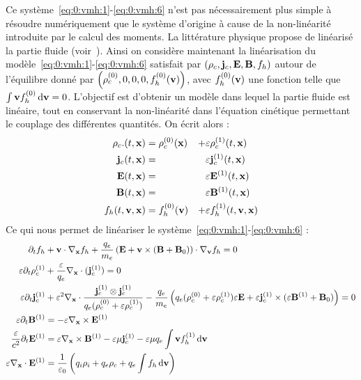 Ce système~\eqref{eq:0:vmh:1}-\eqref{eq:0:vmh:6} n'est pas nécessairement plus simple à résoudre numériquement que le système d'origine à cause de la non-linéarité introduite par le calcul des moments. La littérature physique propose de linéarisé la partie fluide (voir~\cite{Holderied:2019}). Ainsi on considère maintenant la linéarisation du modèle~\eqref{eq:0:vmh:1}-\eqref{eq:0:vmh:6} satisfait par $(\rho_c,\vb{j}_c,\vb{E},\vb{B},f_h)$ autour de l'équilibre donné par $\left(\rho_c^{(0)},0,0,0,f_h^{(0)}(\vb{v})\right)$, avec $f_h^{(0)}(\vb{v})$ une fonction telle que $\int\vb{v}f_h^{(0)}\dd{\vb{v}} = 0$. L'objectif est d'obtenir un modèle dans lequel la partie fluide est linéaire, tout en conservant la non-linéarité dans l'équation cinétique permettant le couplage des différentes quantités. On écrit alors :
\begin{equation}
  \begin{aligned}
    \rho_c. (t,\vb{x}) &= \rho_c^{(0)}(\vb{x}) & + & \varepsilon\rho_c^{(1)}(t,\vb{x}) \\
    \vb{j}_c(t,\vb{x}) &=                      &   & \varepsilon\vb{j}_c^{(1)}(t,\vb{x}) \\
    \vb{E}  (t,\vb{x}) &=                      &   & \varepsilon\vb{E}^{(1)}(t,\vb{x}) \\
    \vb{B}  (t,\vb{x}) &=                      &   & \varepsilon\vb{B}^{(1)}(t,\vb{x}) \\
    f_h(t,\vb{v},\vb{x}) &= f_h^{(0)}(\vb{v})  & + & \varepsilon f_h^{(1)}(t,\vb{v},\vb{x})
  \end{aligned}
\end{equation}
Ce qui nous permet de linéariser le système~\eqref{eq:0:vmh:1}-\eqref{eq:0:vmh:6} :
\begin{align}
	\label{eq:0:vmhleps:1}
		\partial_t f_h &+ \vb{v}\cdot\nabla_{\vb{x}} f_h + \frac{q_e}{m_e}\left( \vb{E} + \vb{v}\times(\vb{B}+\vb{B}_0) \right)\cdot\nabla_{\vb{v}} f_h = 0 \\
	\label{eq:0:vmhleps:2}
		\varepsilon\partial_t\rho_c^{(1)} &+ \frac{\varepsilon}{q_e}\nabla_{\vb{x}}\cdot(\vb{j}_c^{(1)}) = 0 \\
	\label{eq:0:vmhleps:3}
		\varepsilon\partial_t\vb{j}_c^{(1)} &+ \varepsilon^2\nabla_{\vb{x}}\cdot\frac{\vb{j}_c^{(1)}\otimes\vb{j}_c^{(1)}}{q_e(\rho_c^{(0)}+\varepsilon\rho_c^{(1)})} - \frac{q_e}{m_e}\left( q_e(\rho_c^{(0)}+\varepsilon\rho_c^{(1)})\varepsilon\vb{E} + \varepsilon\vb{j}_c^{(1)}\times(\varepsilon\vb{B}^{(1)}+\vb{B}_0) \right) = 0 \\
	\label{eq:0:vmhleps:4}
		\varepsilon\partial_t\vb{B}^{(1)} &= - \varepsilon\nabla_{\vb{x}}\times\vb{E}^{(1)} \\
	\label{eq:0:vmhleps:5}
		\frac{\varepsilon}{c^2}\partial_t\vb{E}^{(1)} &= \varepsilon\nabla_{\vb{x}}\times \vb{B}^{(1)} - \varepsilon\mu\vb{j}_c^{(1)} - \varepsilon\mu q_e\int \vb{v} f_h^{(1)}\dd{\vb{v}} \\
	\label{eq:0:vmhleps:6}
		\varepsilon\nabla_{\vb{x}}\cdot\vb{E}^{(1)} &= \frac{1}{\varepsilon_0}\left( q_i\rho_i + q_e\rho_c + q_e\int f_h\dd{\vb{v}} \right)
\end{align}
